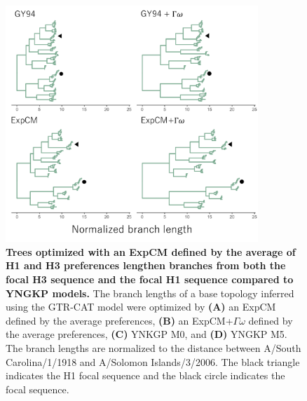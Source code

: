 \documentclass[11pt]{article}
\begin{document}
\begin{figure}[H]
\centerline{\includegraphics[width=0.85\textwidth]{figures/tree_average}}
\caption{\label{fig:tree_average}
\textbf{Trees optimized with an ExpCM defined by the average of H1 and H3 preferences lengthen branches from both the focal H3 sequence and the focal H1 sequence compared to YNGKP models.} 
The branch lengths of a base topology inferred using the GTR-CAT model were optimized by \textbf{(A)} an ExpCM defined by the average preferences, \textbf{(B)} an ExpCM+$\Gamma\omega$ defined by the average preferences, \textbf{(C)} YNKGP M0, and \textbf{(D)} YNGKP M5.
The branch lengths are normalized to the distance between A/South Carolina/1/1918 and A/Solomon Islands/3/2006.
The black triangle indicates the H1 focal sequence and the black circle indicates the focal sequence.
}
\end{figure}
\end{document}
